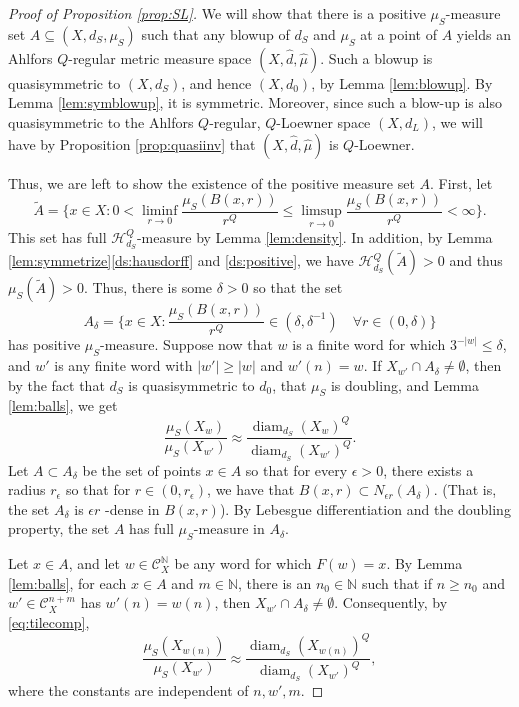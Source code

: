 \documentclass{amsart}
\DeclareMathOperator{\diam}{diam}
\theoremstyle{plain}
\theoremstyle{definition}
\numberwithin{equation}{section}
\numberwithin{theorem}{section}
\newcommand{\HH}{\mathcal{H}}
\newcommand{\N}{\mathbb{N}}
\newcommand{\cC}{\mathcal{C}}
\begin{document}
\begin{proof}[Proof of Proposition \ref{prop:SL}]
We will show that there is a positive $\mu_S$-measure set $A\subseteq (X,d_S, \mu_S)$ such that any blowup of $d_S$ and $\mu_S$ at a point of $A$ yields an Ahlfors $Q$-regular metric measure space $(X,\hat{d},\hat{\mu})$. Such a blowup is quasisymmetric to $(X,d_S)$, and hence $(X,d_0)$, by Lemma \ref{lem:blowup}. By Lemma \ref{lem:symblowup}, it is symmetric. Moreover, since such a blow-up is also quasisymmetric to the Ahlfors $Q$-regular, $Q$-Loewner space $(X,d_L)$, we will have by Proposition \ref{prop:quasiinv} that $(X,\hat{d},\hat{\mu})$ is $Q$-Loewner. 

Thus, we are left to show the existence of the positive measure set $A$. First, let 
\[
\tilde{A}=\{x \in X: 0<\liminf_{r\rightarrow 0} \frac{\mu_S(B(x,r))}{r^Q} \leq \limsup_{r\rightarrow 0} \frac{\mu_S(B(x,r))}{r^Q}<\infty \}.
\]
This set has full  $\HH_{d_S}^Q$-measure by Lemma \ref{lem:density}. In addition, by Lemma \ref{lem:symmetrize}\eqref{ds:hausdorff} and \eqref{ds:positive}, we have $\HH^Q_{d_S}(\tilde{A})>0$ and thus $\mu_S(\tilde{A})>0$. Thus, there is some $\delta>0$ so that the set
\[
A_\delta = \{x\in X: \frac{\mu_S(B(x,r))}{r^Q}\in (\delta, \delta^{-1}) \quad\forall r\in (0,\delta)\}
\]
has positive $\mu_S$-measure. Suppose now that $w$ is a finite word for which $3^{-|w|}\leq \delta$, and $w'$ is any finite word with $|w'|\geq |w|$ and $w'(n)=w$. If $X_{w'}\cap A_\delta \neq \emptyset$, then by the fact that $d_S$ is quasisymmetric to $d_0$, that $\mu_S$ is doubling, and Lemma \ref{lem:balls}, we get
\begin{equation}\label{eq:tilecomp}
\frac{\mu_S(X_w)}{\mu_S(X_{w'})}\approx \frac{\diam_{d_S}(X_{w})^Q}{\diam_{d_S}(X_{w'})^Q}. 
\end{equation}
Let $A\subset A_\delta$ be the set of points $x\in A$ so that for every $\epsilon>0$, there exists a radius $r_\epsilon$ so that for $r\in (0,r_\epsilon)$, we have that $B(x,r)\subset N_{\epsilon r}(A_\delta)$. (That is, the set $A_\delta$ is $\epsilon r$ -dense in $B(x,r)$). By Lebesgue differentiation and the doubling property, the set $A$ has full $\mu_S$-measure in $A_\delta$. 

Let $x\in A$, and let $w\in \cC_X^\N$ be any word for which $F(w)=x$. By Lemma \ref{lem:balls}, for each $x\in A$ and $m\in \N$,  there is an $n_0\in\N$ such that if $n\geq n_0$ and  $w'\in \cC_X^{n+m}$ has $w'(n)=w(n)$, then $X_{w'}\cap A_\delta\neq \emptyset$. Consequently, by \eqref{eq:tilecomp},
\[
\frac{\mu_S(X_{w(n)})}{\mu_S(X_{w'})}\approx \frac{\diam_{d_S}(X_{w(n)})^Q}{\diam_{{d_S}}(X_{w'})^Q},
\]
where the constants are independent of $n,w',m$.  


\end{proof}
\end{document}

